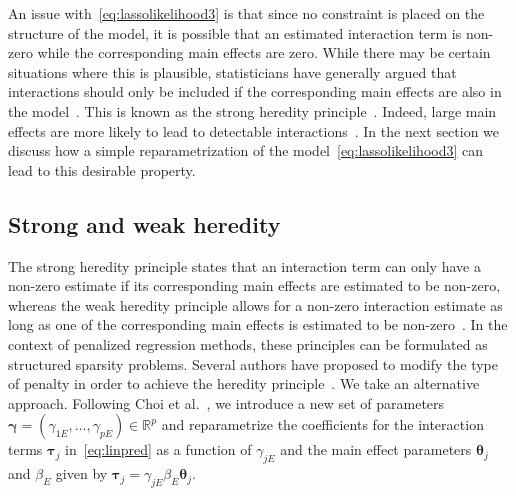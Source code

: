 \documentclass[useAMS,usenatbib,referee]{biom}
\makeatletter
\newcommand{\tm}[1]{\textrm{{#1}}}
\newcommand{\balpha}{\boldsymbol{\alpha}}
\newcommand{\btau}{\boldsymbol{\tau}}
\newcommand{\bgamma}{\boldsymbol{\gamma}}
\newcommand{\btheta}{\boldsymbol{\theta}}
\DeclarePairedDelimiter\norm{\lVert}{\rVert}%
\let\oldnorm\norm
\def\norm{\@ifstar{\oldnorm}{\oldnorm*}}
\makeatother
\begin{document}
An issue with~\eqref{eq:lassolikelihood3} is that since no constraint is placed on the structure of the model, it is possible that an estimated interaction term is non-zero while the corresponding main effects are zero. While there may be certain situations where this is plausible, statisticians have generally argued that interactions should only be included if the corresponding main effects are also in the model~\citep{mccullagh1989generalized}. This is known as the strong heredity principle~\citep{chipman1996bayesian}. Indeed, large main effects are more likely to lead to detectable interactions~\citep{cox1984interaction}. In the next section we discuss how a simple reparametrization of the model~\eqref{eq:lassolikelihood3} can lead to this desirable property.

\subsection{Strong and weak heredity}

The strong heredity principle states that an interaction term can only have a non-zero estimate if its corresponding main effects are estimated to be non-zero, whereas the weak heredity principle allows for a non-zero interaction estimate as long as one of the corresponding main effects is estimated to be non-zero~\citep{chipman1996bayesian}. 
In the context of penalized regression methods, these principles can be formulated as structured sparsity \citep{bach2012structured} problems. 
Several authors have proposed to modify the type of penalty in order to achieve the heredity principle~\citep{radchenko2010variable,bien2013lasso,lim2015learning,haris2016convex}. 
We take an alternative approach. Following Choi et al.~\citep{choi2010variable}, we introduce a new set of parameters $\bgamma = (\gamma_{1E}, \ldots, \gamma_{pE})\in \mathbb{R}^p$ and reparametrize the coefficients for the interaction terms $\btau_j$ in~\eqref{eq:linpred} as a function of $\gamma_{jE}$ and the main effect parameters $\btheta_j$ and $\beta_E$ given by $\btau_{j} = \gamma_{jE} \beta_E \btheta_j$.
\end{document}
